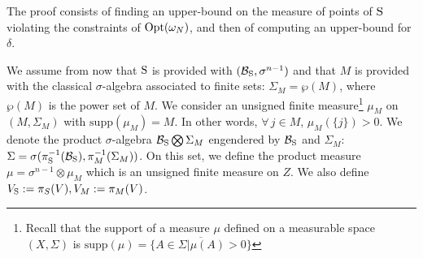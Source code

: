 
The proof consists of finding an upper-bound on the measure of points of $\text{S}$ violating the constraints of $\text{Opt}(\omega_N)$, and then of computing an upper-bound for $\delta$.

We assume from now that $\text{S}$ is provided with $(\mathcal{B}_{\text{S}},\sigma^{n-1})$ and that $M$ is provided with the classical $\sigma$-algebra associated to finite sets: $\Sigma_M = \wp(M)$, where $\wp(M)$ is the power set of $M$. We consider an unsigned finite measure\footnote{Recall that the support of a measure $\mu$ defined on a measurable space $(X, \Sigma)$ is $\text{supp}(\mu) = \overline{\{A \in \Sigma | \mu(A) > 0 \}}$} $\mu_M$ on $(M, \Sigma_M)$ with $\text{supp} (\mu_M) = M$. In other words, $\forall\,j \in M$, $\mu_M(\{j\})  > 0$. We denote the product $\sigma$-algebra $\mathcal{B}_{\text{S}} \bigotimes \Sigma_M$ engendered by $\mathcal{B}_{\text{S}}$ and $\Sigma_M$: $\Sigma = \sigma( \pi_{\text{S}}^{-1}(\mathcal{B}_{\text{S}}),  \pi_{M}^{-1}(\Sigma_M))$. On this set, we define the product measure $\mu = \sigma^{n-1} \otimes \mu_M$ which is an unsigned finite measure on $Z$. We also define $V_{\text{S}}:=\pi_S(V), V_M:=\pi_M(V)$.